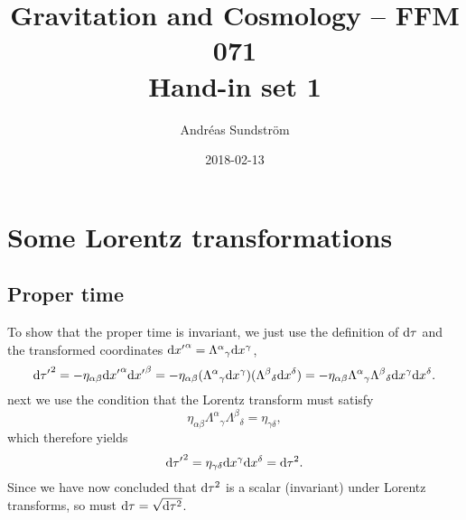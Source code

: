 \documentclass[11pt,a4paper, 
swedish, english %
]{article}
\begin{document}


%


\title{Gravitation and Cosmology -- FFM 071
\\ {\Large Hand-in set 1} }
\author{Andréas Sundström}
\date{2018-02-13}

\maketitle



\renewcommand{\thesubsection}{\arabic{section} (\alph{subsection})}
\section{Some Lorentz transformations}
\subsection{Proper time}
To show that the proper time is invariant, we just use the definition
of $\mathrm{d}\tau$ and the transformed coordinates 
$\mathrm{d}{x'}^\alpha={\Lambda^\alpha}_\gamma \mathrm{d}{x}^{\gamma}$,
\begin{equation}
\mathrm{d}{\tau'}^2=-\eta_{\alpha\beta}\mathrm{d}{x'}^{\alpha}\mathrm{d}{x'}^{\beta}
=-\eta_{\alpha\beta}({\Lambda^\alpha}_\gamma \mathrm{d}{x}^{\gamma})
({\Lambda^\beta}_\delta\mathrm{d}{x}^{\delta})
=-\eta_{\alpha\beta}{\Lambda^\alpha}_\gamma{\Lambda^\beta}_\delta
\mathrm{d}{x}^{\gamma}\mathrm{d}{x}^{\delta}.
\end{equation}
next we use the condition that the Lorentz transform must satisfy
\begin{equation}
\eta_{\alpha\beta}{\Lambda^\alpha}_\gamma{\Lambda^\beta}_\delta
=\eta_{\gamma\delta},
\end{equation}
which therefore yields
\begin{equation}
\mathrm{d}{\tau'}^2=\eta_{\gamma\delta}\mathrm{d}{x}^{\gamma}\mathrm{d}{x}^{\delta}
=\mathrm{d}\tau^2.
\end{equation}
Since we have now concluded that $\mathrm{d}\tau^2$ is a scalar (invariant)
under Lorentz transforms, so must $\mathrm{d}\tau=\sqrt{\mathrm{d}\tau^2}$.
\end{document}
